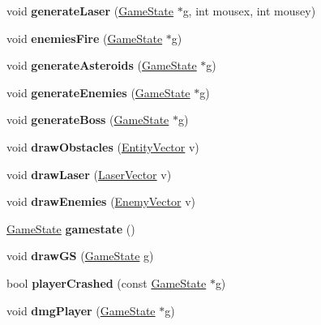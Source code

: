 \begin{DoxyCompactItemize}
void {\bfseries generate\+Laser} (\hyperlink{structgamestate__t}{Game\+State} $\ast$g, int mousex, int mousey)
\item 
\mbox{\label{group__GameState_gae26629d3fa543d71fd403d96d75e676b}} 
void {\bfseries enemies\+Fire} (\hyperlink{structgamestate__t}{Game\+State} $\ast$g)
\item 
\mbox{\label{group__GameState_ga08df31225cd66f69f46a43f62b43eea8}} 
void {\bfseries generate\+Asteroids} (\hyperlink{structgamestate__t}{Game\+State} $\ast$g)
\item 
\mbox{\label{group__GameState_gabf522683f3bcbb24fab722651c3787a6}} 
void {\bfseries generate\+Enemies} (\hyperlink{structgamestate__t}{Game\+State} $\ast$g)
\item 
\mbox{\label{group__GameState_ga739e57d59b88a86b78761e1ae4354a37}} 
void {\bfseries generate\+Boss} (\hyperlink{structgamestate__t}{Game\+State} $\ast$g)
\item 
\mbox{\label{group__GameState_ga4d3b62d89c12e174b94d12248afff1ec}} 
void {\bfseries draw\+Obstacles} (\hyperlink{structentityVector}{Entity\+Vector} v)
\item 
\mbox{\label{group__GameState_gae1ce0b2c6ceffab8e49822363129b50d}} 
void {\bfseries draw\+Laser} (\hyperlink{structlaserVector}{Laser\+Vector} v)
\item 
\mbox{\label{group__GameState_gabc18002f17595749d02f53864e14b3df}} 
void {\bfseries draw\+Enemies} (\hyperlink{structenemyVector}{Enemy\+Vector} v)
\item 
\mbox{\label{group__GameState_ga880f2f7a30da7564b882081e4a348c76}} 
\hyperlink{structgamestate__t}{Game\+State} {\bfseries gamestate} ()
\item 
\mbox{\label{group__GameState_gaf00fe05010175ac4cf77fefc3ffe73c4}} 
void {\bfseries draw\+GS} (\hyperlink{structgamestate__t}{Game\+State} g)
\item 
\mbox{\label{group__GameState_ga80c87f2335754f1a0d8ddda56bca59b2}} 
bool {\bfseries player\+Crashed} (const \hyperlink{structgamestate__t}{Game\+State} $\ast$g)
\item 
\mbox{\label{group__GameState_ga8fafadb5d34a50da3b0f07f9f9382dfd}} 
void {\bfseries dmg\+Player} (\hyperlink{structgamestate__t}{Game\+State} $\ast$g)
\end{DoxyCompactItemize}
